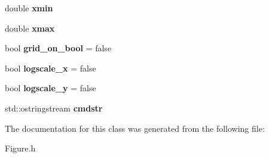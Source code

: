 \begin{DoxyCompactItemize}
\item 
\hypertarget{classkeycpp_1_1_plots_a1d027ed119d5b4a8d7d9ccc72f9a0eb1}{double {\bfseries xmin}}\label{classkeycpp_1_1_plots_a1d027ed119d5b4a8d7d9ccc72f9a0eb1}

\item 
\hypertarget{classkeycpp_1_1_plots_a4d7f34173d13de92014702ffba6fb1d4}{double {\bfseries xmax}}\label{classkeycpp_1_1_plots_a4d7f34173d13de92014702ffba6fb1d4}

\item 
\hypertarget{classkeycpp_1_1_plots_abd0c4449bcd999429a3073e2885708d8}{bool {\bfseries grid\-\_\-on\-\_\-bool} = false}\label{classkeycpp_1_1_plots_abd0c4449bcd999429a3073e2885708d8}

\item 
\hypertarget{classkeycpp_1_1_plots_aa994c8e9f09633b26410ed27ea70a1a1}{bool {\bfseries logscale\-\_\-x} = false}\label{classkeycpp_1_1_plots_aa994c8e9f09633b26410ed27ea70a1a1}

\item 
\hypertarget{classkeycpp_1_1_plots_a605e7e4681e977f5d1d2ff95d72946cb}{bool {\bfseries logscale\-\_\-y} = false}\label{classkeycpp_1_1_plots_a605e7e4681e977f5d1d2ff95d72946cb}

\item 
\hypertarget{classkeycpp_1_1_plots_a0ed0add050a618468cbf2cffe2529bad}{std\-::ostringstream {\bfseries cmdstr}}\label{classkeycpp_1_1_plots_a0ed0add050a618468cbf2cffe2529bad}

\end{DoxyCompactItemize}


The documentation for this class was generated from the following file\-:\begin{DoxyCompactItemize}
\item 
Figure.\-h\end{DoxyCompactItemize}
